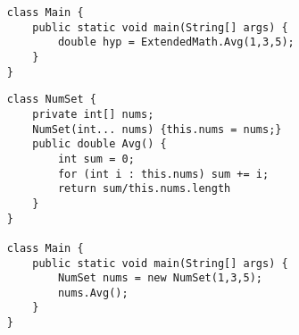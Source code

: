 \documentclass[letterpaper, openany, justified]{tufte-book}
\begin{document}
\begin{fullwidth}
\begin{multicols}{2}
\begin{lstlisting}
    class Main {
        public static void main(String[] args) {
            double hyp = ExtendedMath.Avg(1,3,5);
        }
    }
\end{lstlisting}

\columnbreak
\begin{lstlisting}
    class NumSet {
        private int[] nums;
        NumSet(int... nums) {this.nums = nums;}
        public double Avg() {
            int sum = 0;
            for (int i : this.nums) sum += i;
            return sum/this.nums.length
        }
    }

    class Main {
        public static void main(String[] args) {
            NumSet nums = new NumSet(1,3,5);
            nums.Avg();
        }
    }
\end{lstlisting}
\end{multicols}

\end{fullwidth}
\end{document}
